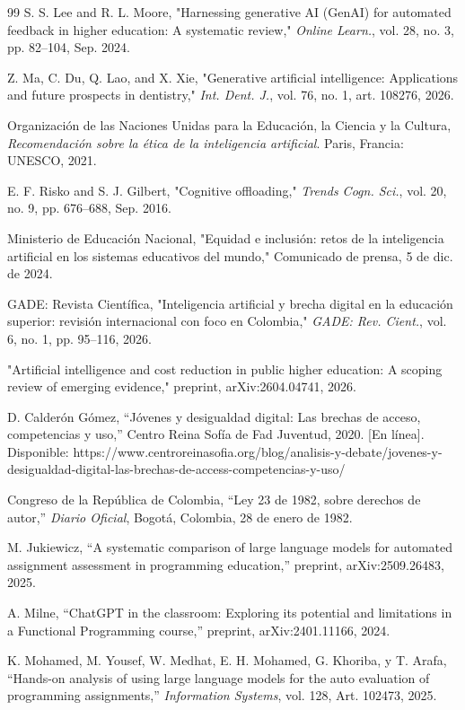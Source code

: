 \documentclass[letterpaper, 10 pt, conference]{ieeeconf}
\begin{document}
\begin{thebibliography}{99}
 S. S. Lee and R. L. Moore, "Harnessing generative AI (GenAI) for automated feedback in higher education: A systematic review," \textit{Online Learn.}, vol. 28, no. 3, pp. 82–104, Sep. 2024.

 Z. Ma, C. Du, Q. Lao, and X. Xie, "Generative artificial intelligence: Applications and future prospects in dentistry," \textit{Int. Dent. J.}, vol. 76, no. 1, art. 108276, 2026.

 Organización de las Naciones Unidas para la Educación, la Ciencia y la Cultura, \textit{Recomendación sobre la ética de la inteligencia artificial}. Paris, Francia: UNESCO, 2021.

 E. F. Risko and S. J. Gilbert, "Cognitive offloading," \textit{Trends Cogn. Sci.}, vol. 20, no. 9, pp. 676–688, Sep. 2016.

 Ministerio de Educación Nacional, "Equidad e inclusión: retos de la inteligencia artificial en los sistemas educativos del mundo," Comunicado de prensa, 5 de dic. de 2024.

 GADE: Revista Científica, "Inteligencia artificial y brecha digital en la educación superior: revisión internacional con foco en Colombia," \textit{GADE: Rev. Cient.}, vol. 6, no. 1, pp. 95–116, 2026.

 "Artificial intelligence and cost reduction in public higher education: A scoping review of emerging evidence," preprint, arXiv:2604.04741, 2026.

 D. Calderón Gómez, “Jóvenes y desigualdad digital: Las brechas de acceso, competencias y uso,” Centro Reina Sofía de Fad Juventud, 2020. [En línea]. Disponible: https://www.centroreinasofia.org/blog/analisis-y-debate/jovenes-y-desigualdad-digital-las-brechas-de-access-competencias-y-uso/

 Congreso de la República de Colombia, “Ley 23 de 1982, sobre derechos de autor,” \textit{Diario Oficial}, Bogotá, Colombia, 28 de enero de 1982.

 M. Jukiewicz, “A systematic comparison of large language models for automated assignment assessment in programming education,” preprint, arXiv:2509.26483, 2025.

 A. Milne, “ChatGPT in the classroom: Exploring its potential and limitations in a Functional Programming course,” preprint, arXiv:2401.11166, 2024.

 K. Mohamed, M. Yousef, W. Medhat, E. H. Mohamed, G. Khoriba, y T. Arafa, “Hands-on analysis of using large language models for the auto evaluation of programming assignments,” \textit{Information Systems}, vol. 128, Art. 102473, 2025.


\end{thebibliography}
\end{document}

